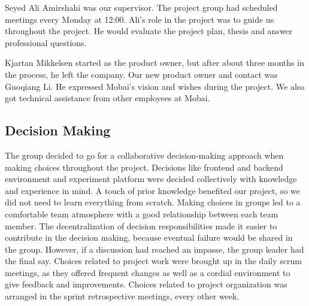 Seyed Ali Amirshahi was our supervisor. The project group had scheduled meetings every Monday at 12:00. Ali's role in the project was to guide us throughout the project. He would evaluate the project plan, thesis and answer professional questions. 

Kjartan Mikkelsen started as the product owner, but after about three months in the process, he left the company. Our new product owner and contact was Guoqiang Li. He expressed Mobai's vision and wishes during the project. We also got technical assistance from other employees at Mobai. 

\subsection{Decision Making}
The group decided to go for a collaborative decision-making \cite{GroupDecisionMaking} approach when making choices throughout the project. Decisions like frontend and backend environment and experiment platform were decided collectively with knowledge and experience in mind. A touch of prior knowledge benefited our project, so we did not need to learn everything from scratch. Making choices in groups led to a comfortable team atmosphere with a good relationship between each team member. The decentralization of decision responsibilities made it easier to contribute in the decision making, because eventual failure would be shared in the group. However, if a discussion had reached an impasse, the group leader had the final say. Choices related to project work were brought up in the daily scrum meetings, as they offered frequent changes as well as a cordial environment to give feedback and improvements. Choices related to project organization was arranged in the sprint retrospective meetings, every other week. 


